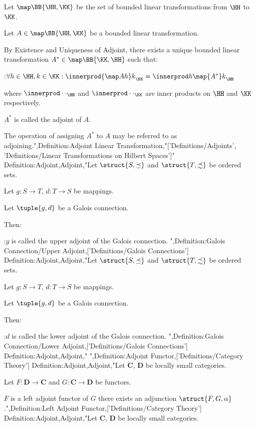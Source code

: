 Let $\map \BB {\HH, \KK}$ be the set of bounded linear transformations from $\HH$ to $\KK$.

Let $A \in \map \BB {\HH, \KK}$ be a bounded linear transformation.


By Existence and Uniqueness of Adjoint, there exists a unique bounded linear transformation $A^* \in \map \BB {\KK, \HH}$ such that:

:$\forall h \in \HH, k \in \KK: {\innerprod {\map A h} k}_\KK = {\innerprod h {\map {A^*} k} }_\HH$

where $\innerprod \cdot \cdot_\HH$ and $\innerprod \cdot \cdot_\KK$ are inner products on $\HH$ and $\KK$ respectively.


$A^*$ is called the adjoint of $A$.


The operation of assigning $A^*$ to $A$ may be referred to as adjoining.",Definition:Adjoint Linear Transformation,"['Definitions/Adjoints', 'Definitions/Linear Transformations on Hilbert Spaces']"
Definition:Adjoint,Adjoint,"Let $\struct {S, \preceq}$ and $\struct {T, \precsim}$ be ordered sets.

Let $g: S \to T$, $d: T \to S$ be mappings.

Let $\tuple {g, d}$ be a Galois connection.


Then:

:$g$ is called the upper adjoint of the Galois connection.
",Definition:Galois Connection/Upper Adjoint,['Definitions/Galois Connections']
Definition:Adjoint,Adjoint,"Let $\struct {S, \preceq}$ and $\struct {T, \precsim}$ be ordered sets.

Let $g: S \to T$, $d: T \to S$ be mappings.

Let $\tuple {g, d}$ be a Galois connection.


Then:

:$d$ is called the lower adjoint of the Galois connection.
",Definition:Galois Connection/Lower Adjoint,['Definitions/Galois Connections']
Definition:Adjoint,Adjoint,"
",Definition:Adjoint Functor,['Definitions/Category Theory']
Definition:Adjoint,Adjoint,"Let $\mathbf C$, $\mathbf D$ be locally small categories.

Let $F : \mathbf D \to \mathbf C$ and $G : \mathbf C \to \mathbf D$ be functors.

$F$ is a left adjoint functor of $G$  there exists an adjunction $\struct {F, G, \alpha}$.",Definition:Left Adjoint Functor,['Definitions/Category Theory']
Definition:Adjoint,Adjoint,"Let $\mathbf C$, $\mathbf D$ be locally small categories.

